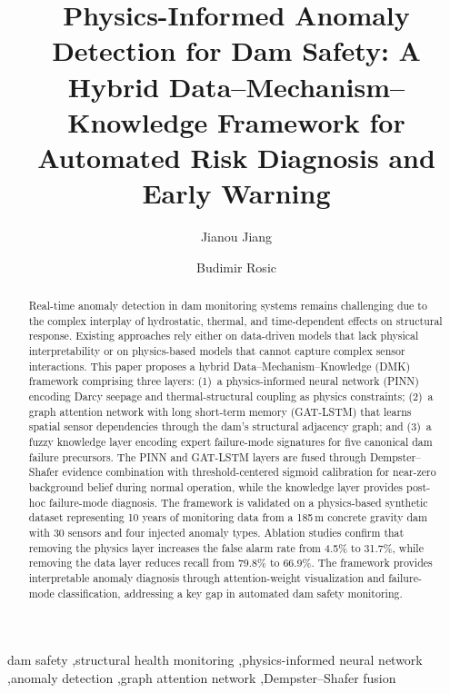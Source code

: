 \documentclass[preprint,12pt,review]{elsarticle}
\begin{document}
\begin{frontmatter}
\title{Physics-Informed Anomaly Detection for Dam Safety: A Hybrid Data--Mechanism--Knowledge Framework for Automated Risk Diagnosis and Early Warning}
\author[ox]{Jianou Jiang}
\author[ox2]{Budimir Rosic}
\begin{abstract}
Real-time anomaly detection in dam monitoring systems remains challenging due to the complex interplay of hydrostatic, thermal, and time-dependent effects on structural response. Existing approaches rely either on data-driven models that lack physical interpretability or on physics-based models that cannot capture complex sensor interactions. This paper proposes a hybrid Data--Mechanism--Knowledge (DMK) framework comprising three layers: (1)~a physics-informed neural network (PINN) encoding Darcy seepage and thermal-structural coupling as physics constraints; (2)~a graph attention network with long short-term memory (GAT-LSTM) that learns spatial sensor dependencies through the dam's structural adjacency graph; and (3)~a fuzzy knowledge layer encoding expert failure-mode signatures for five canonical dam failure precursors. The PINN and GAT-LSTM layers are fused through Dempster--Shafer evidence combination with threshold-centered sigmoid calibration for near-zero background belief during normal operation, while the knowledge layer provides post-hoc failure-mode diagnosis. The framework is validated on a physics-based synthetic dataset representing 10 years of monitoring data from a 185\,m concrete gravity dam with 30 sensors and four injected anomaly types. Ablation studies confirm that removing the physics layer increases the false alarm rate from 4.5\% to 31.7\%, while removing the data layer reduces recall from 79.8\% to 66.9\%. The framework provides interpretable anomaly diagnosis through attention-weight visualization and failure-mode classification, addressing a key gap in automated dam safety monitoring.
\end{abstract}
\begin{keyword}
dam safety \sep structural health monitoring \sep physics-informed neural network \sep anomaly detection \sep graph attention network \sep Dempster--Shafer fusion
\end{keyword}
\end{frontmatter}
\linenumbers
\end{document}
